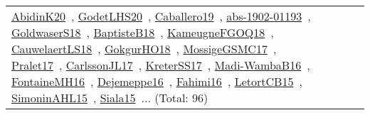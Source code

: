 {\begin{longtable}{lp{3cm}>{\raggedright\arraybackslash}p{6cm}>{\raggedright\arraybackslash}p{6cm}>{\raggedright\arraybackslash}p{8cm}}
\href{../works/AbidinK20.pdf}{AbidinK20}~\cite{AbidinK20}, \href{../works/GodetLHS20.pdf}{GodetLHS20}~\cite{GodetLHS20}, \href{../works/Caballero19.pdf}{Caballero19}~\cite{Caballero19}, \href{../works/abs-1902-01193.pdf}{abs-1902-01193}~\cite{abs-1902-01193}, \href{../works/GoldwaserS18.pdf}{GoldwaserS18}~\cite{GoldwaserS18}, \href{../works/BaptisteB18.pdf}{BaptisteB18}~\cite{BaptisteB18}, \href{../works/KameugneFGOQ18.pdf}{KameugneFGOQ18}~\cite{KameugneFGOQ18}, \href{../works/CauwelaertLS18.pdf}{CauwelaertLS18}~\cite{CauwelaertLS18}, \href{../works/GokgurHO18.pdf}{GokgurHO18}~\cite{GokgurHO18}, \href{../works/MossigeGSMC17.pdf}{MossigeGSMC17}~\cite{MossigeGSMC17}, \href{../works/Pralet17.pdf}{Pralet17}~\cite{Pralet17}, \href{../works/CarlssonJL17.pdf}{CarlssonJL17}~\cite{CarlssonJL17}, \href{../works/KreterSS17.pdf}{KreterSS17}~\cite{KreterSS17}, \href{../works/Madi-WambaB16.pdf}{Madi-WambaB16}~\cite{Madi-WambaB16}, \href{../works/FontaineMH16.pdf}{FontaineMH16}~\cite{FontaineMH16}, \href{../works/Dejemeppe16.pdf}{Dejemeppe16}~\cite{Dejemeppe16}, \href{../works/Fahimi16.pdf}{Fahimi16}~\cite{Fahimi16}, \href{../works/LetortCB15.pdf}{LetortCB15}~\cite{LetortCB15}, \href{../works/SimoninAHL15.pdf}{SimoninAHL15}~\cite{SimoninAHL15}, \href{../works/Siala15.pdf}{Siala15}~\cite{Siala15}... (Total: 96)\\

\end{longtable}}
